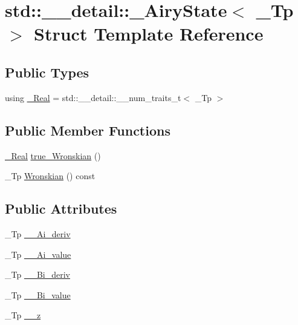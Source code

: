 \hypertarget{structstd_1_1____detail_1_1__AiryState}{}\section{std\+:\+:\+\_\+\+\_\+detail\+:\+:\+\_\+\+Airy\+State$<$ \+\_\+\+Tp $>$ Struct Template Reference}
\label{structstd_1_1____detail_1_1__AiryState}
\subsection*{Public Types}
\begin{DoxyCompactItemize}
\item 
using \hyperlink{structstd_1_1____detail_1_1__AiryState_a8fc5c7c19e6dd8f25f1e4103f74c0a3b}{\+\_\+\+Real} = std\+::\+\_\+\+\_\+detail\+::\+\_\+\+\_\+num\+\_\+traits\+\_\+t$<$ \+\_\+\+Tp $>$
\end{DoxyCompactItemize}
\subsection*{Public Member Functions}
\begin{DoxyCompactItemize}
\item 
\hyperlink{structstd_1_1____detail_1_1__AiryState_a8fc5c7c19e6dd8f25f1e4103f74c0a3b}{\+\_\+\+Real} \hyperlink{structstd_1_1____detail_1_1__AiryState_a6c519145b38f24b2dab705fbc23f49d6}{true\+\_\+\+Wronskian} ()
\item 
\+\_\+\+Tp \hyperlink{structstd_1_1____detail_1_1__AiryState_a7a31496eb0f0cff0f131c0d9689d6e1e}{Wronskian} () const 
\end{DoxyCompactItemize}
\subsection*{Public Attributes}
\begin{DoxyCompactItemize}
\item 
\+\_\+\+Tp \hyperlink{structstd_1_1____detail_1_1__AiryState_a3d918b7b8cb09fd4bb57c10a5853c36f}{\+\_\+\+\_\+\+Ai\+\_\+deriv}
\item 
\+\_\+\+Tp \hyperlink{structstd_1_1____detail_1_1__AiryState_ad4a37f92020588e84a18fc1e93b02af6}{\+\_\+\+\_\+\+Ai\+\_\+value}
\item 
\+\_\+\+Tp \hyperlink{structstd_1_1____detail_1_1__AiryState_a0f80df510bae0d9a812fae2a20ac3c20}{\+\_\+\+\_\+\+Bi\+\_\+deriv}
\item 
\+\_\+\+Tp \hyperlink{structstd_1_1____detail_1_1__AiryState_a10ef7705b2b52a40502d75e62add672f}{\+\_\+\+\_\+\+Bi\+\_\+value}
\item 
\+\_\+\+Tp \hyperlink{structstd_1_1____detail_1_1__AiryState_a7606b501eba3f9b55aafa1706d7c9cc1}{\+\_\+\+\_\+z}
\end{DoxyCompactItemize}


